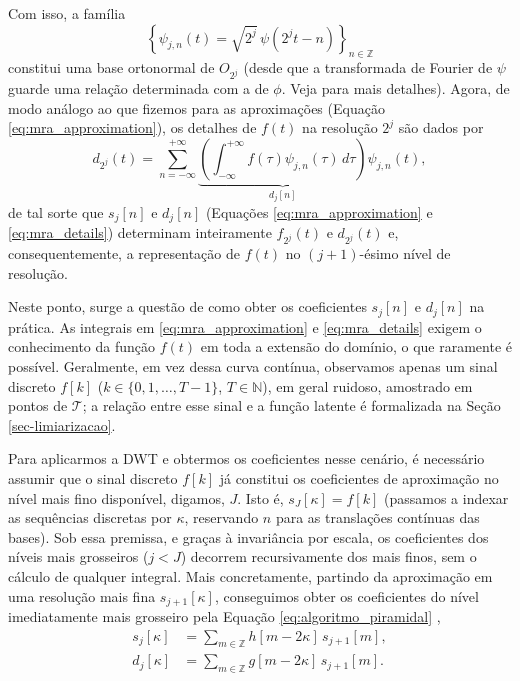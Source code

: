 Com isso, a família
\begin{equation}
    \left\{ \psi_{j,n}(t) = \sqrt{2^{j}} \, \psi(2^j t - n) \right\}_{n \in \mathbb{Z}}
    \label{eq:wavelets_basis}
\end{equation}
constitui uma base ortonormal de \(O_{2^j}\) (desde que a transformada de Fourier de \(\psi\) guarde uma relação determinada com a de \(\phi\). Veja  para mais detalhes).
Agora, de modo análogo ao que fizemos para as aproximações (Equação \ref{eq:mra_approximation}), os detalhes de \(f(t)\) na resolução \(2^j\) são dados por
\begin{equation}
    d_{2^j}(t) = \sum_{n = -\infty}^{+\infty} \underbrace{\left( \int_{-\infty}^{+\infty} f(\tau) \psi_{j,n}(\tau) \, d\tau \right)}_{d_j[n]} \psi_{j,n}(t),
    \label{eq:mra_details}
\end{equation}
de tal sorte que \(s_j[n]\) e \(d_j[n]\) (Equações \ref{eq:mra_approximation} e \ref{eq:mra_details}) determinam inteiramente \(f_{2^j}(t)\) e \(d_{2^j}(t)\) e, consequentemente, a representação de \(f(t)\) no \((j + 1)\)-ésimo nível de resolução.

Neste ponto, surge a questão de como obter os coeficientes \(s_j[n]\) e \(d_j[n]\) na prática. As integrais em \ref{eq:mra_approximation} e \ref{eq:mra_details} exigem o conhecimento da função \(f(t)\) em toda a extensão do domínio, o que raramente é possível.
Geralmente, em vez dessa curva contínua, observamos apenas um sinal discreto \(f[k]\) (\(k \in \{0, 1, \dots, T-1\}\), \(T \in \mathbb{N}\)), em geral ruidoso, amostrado em pontos de \(\mathcal{T}\); a relação entre esse sinal e a função latente é formalizada na Seção \ref{sec-limiarizacao}.

Para aplicarmos a DWT e obtermos os coeficientes nesse cenário, é necessário assumir que o sinal discreto \(f[k]\) já constitui os coeficientes de aproximação no nível mais fino disponível, digamos, \(J\). Isto é, \(s_J[\kappa] = f[k]\) (passamos a indexar as sequências discretas por \(\kappa\), reservando \(n\) para as translações contínuas das bases).
Sob essa premissa, e graças à invariância por escala, os coeficientes dos níveis mais grosseiros (\(j < J\)) decorrem recursivamente dos mais finos, sem o cálculo de qualquer integral.
Mais concretamente, partindo da aproximação em uma resolução mais fina \(s_{j+1}[\kappa]\), conseguimos obter os coeficientes do nível imediatamente mais grosseiro pela Equação \ref{eq:algoritmo_piramidal} \cite{mallat_theory_1989},
\begin{equation}
    \begin{aligned}
        s_{j}[\kappa] &= \sum_{m \in \mathbb{Z}} h[m-2\kappa] \, s_{j+1}[m], \\
        d_{j}[\kappa] &= \sum_{m \in \mathbb{Z}} g[m-2\kappa] \, s_{j+1}[m].
    \end{aligned}
    \label{eq:algoritmo_piramidal}
\end{equation}

